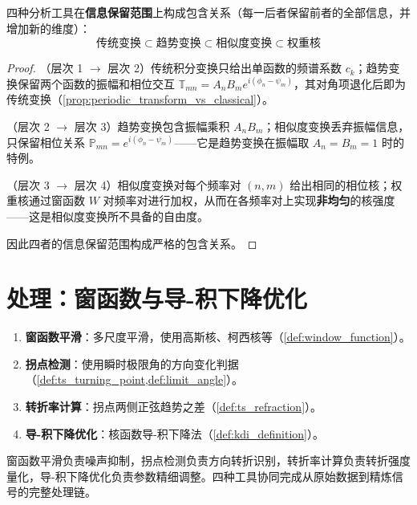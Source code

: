 \begin{proposition}[分析工具链的包含结构]\label{prop:analysis_hierarchy}
四种分析工具在\textbf{信息保留范围}上构成包含关系（每一后者保留前者的全部信息，并增加新的维度）：
\[
\text{传统变换} \subset \text{趋势变换} \subset \text{相似度变换} \subset \text{权重核}
\]
\end{proposition}

\begin{proof}
（层次 1 $\to$ 层次 2）传统积分变换只给出单函数的频谱系数 $c_k$；趋势变换保留两个函数的振幅和相位交互 $\mathbb{T}_{mn} = A_n B_m e^{i(\phi_n - \psi_m)}$，其对角项退化后即为传统变换（\cref{prop:periodic_transform_vs_classical}）。

（层次 2 $\to$ 层次 3）趋势变换包含振幅乘积 $A_n B_m$；相似度变换丢弃振幅信息，只保留相位关系 $\mathbb{P}_{mn} = e^{i(\phi_n - \psi_m)}$——它是趋势变换在振幅取 $A_n = B_m = 1$ 时的特例。

（层次 3 $\to$ 层次 4）相似度变换对每个频率对 $(n,m)$ 给出相同的相位核；权重核通过窗函数 $W$ 对频率对进行加权，从而在各频率对上实现\textbf{非均匀}的核强度——这是相似度变换所不具备的自由度。

因此四者的信息保留范围构成严格的包含关系。
\end{proof}

\section{处理：窗函数与导-积下降优化}

\begin{definition}[处理的工具]\label{def:processing_tools}
\begin{enumerate}[label=(\roman*)]
    \item \textbf{窗函数平滑}：多尺度平滑，使用高斯核、柯西核等（\cref{def:window_function}）。
    \item \textbf{拐点检测}：使用瞬时极限角的方向变化判据（\cref{def:ts_turning_point,def:limit_angle}）。
    \item \textbf{转折率计算}：拐点两侧正弦趋势之差（\cref{def:ts_refraction}）。
    \item \textbf{导-积下降优化}：核函数导-积下降法（\cref{def:kdi_definition}）。
\end{enumerate}
\end{definition}

\begin{proposition}[处理工具的分工]\label{prop:processing_division}
窗函数平滑负责噪声抑制，拐点检测负责方向转折识别，转折率计算负责转折强度量化，导-积下降优化负责参数精细调整。四种工具协同完成从原始数据到精炼信号的完整处理链。
\end{proposition}

